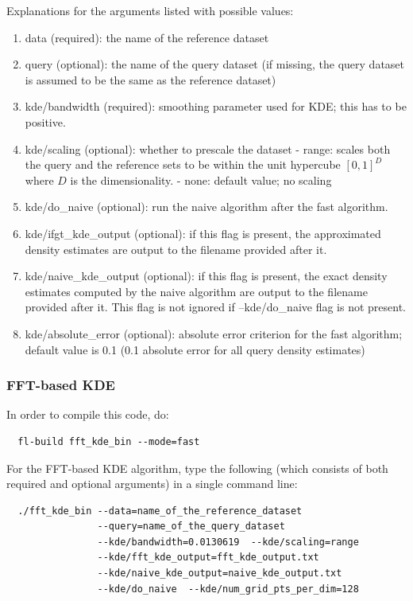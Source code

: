 \documentclass[letter]{report}
\begin{document}
Explanations for the arguments listed with possible values:

\begin{enumerate}
\item{data (required): the name of the reference dataset}
\item{query (optional): the name of the query dataset (if missing, the
 query dataset is assumed to be the same as the reference dataset)}
\item{kde/bandwidth (required): smoothing parameter used for KDE; this
 has to be positive.}
\item{kde/scaling (optional): whether to prescale the dataset - range:
scales both the query and the reference sets to be within the unit
hypercube $[0, 1]^D$ where $D$ is the dimensionality.  - none: default
value; no scaling}
\item{kde/do\_naive (optional): run the naive algorithm after the fast
algorithm.}
\item{kde/ifgt\_kde\_output (optional): if this flag is present, the
approximated density estimates are output to the filename provided
after it.}
\item{kde/naive\_kde\_output (optional): if this flag is present, the
 exact density estimates computed by the naive algorithm are output to
 the filename provided after it. This flag is not ignored if
 --kde/do\_naive flag is not present.}
\item{kde/absolute\_error (optional): absolute error criterion for the
 fast algorithm; default value is 0.1 (0.1 absolute error for all
 query density estimates)}
\end{enumerate}

\subsubsection{FFT-based KDE}
In order to compile this code, do: 
\begin{verbatim}
  fl-build fft_kde_bin --mode=fast
\end{verbatim}
For the FFT-based KDE algorithm, type the
following (which consists of both required and optional arguments) in
a single command line:
\begin{verbatim}
  ./fft_kde_bin --data=name_of_the_reference_dataset
                --query=name_of_the_query_dataset
                --kde/bandwidth=0.0130619  --kde/scaling=range
                --kde/fft_kde_output=fft_kde_output.txt
                --kde/naive_kde_output=naive_kde_output.txt
                --kde/do_naive  --kde/num_grid_pts_per_dim=128
\end{verbatim}
\end{document}
